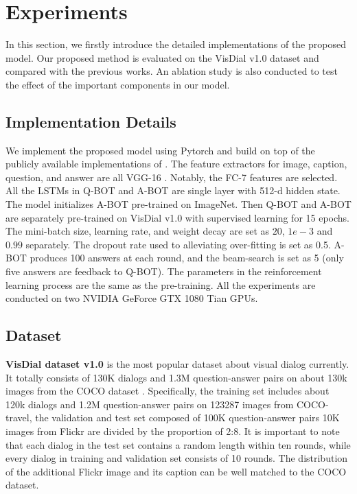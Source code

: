 \documentclass[review]{elsarticle}
\begin{document}
	\section{Experiments}
	In this section, we firstly introduce the detailed implementations of the proposed model. Our proposed method is evaluated on the VisDial v1.0 dataset and compared with the previous works. An ablation study is also conducted to test the effect of the important components in our model. 
	\subsection{Implementation Details} 
	We implement the proposed model using Pytorch and build on top of the publicly available implementations of \cite{DBLP:conf/iccv/DasKMLB17}. 
	The feature extractors for image, caption, question, and answer are all VGG-16 \cite{DBLP:journals/corr/SimonyanZ14a}. Notably, the FC-7 features are selected. 
	All the LSTMs in Q-BOT and A-BOT are single layer with 512-d hidden state. The model initializes A-BOT pre-trained on ImageNet. 
	Then Q-BOT and A-BOT are separately pre-trained on VisDial v1.0 with supervised learning for 15 epochs. The mini-batch size, learning rate, and weight decay are set as $20$, $1e-3$ and $0.99$ separately. The dropout rate used to alleviating over-fitting is set as 0.5. 
	A-BOT produces 100 answers at each round, and the beam-search is set as 5 (only five answers are feedback to Q-BOT). The parameters in the reinforcement learning process are the same as the pre-training. All the experiments are conducted on two NVIDIA GeForce GTX 1080 Tian GPUs. 
	
	\subsection{Dataset}
	\textbf{VisDial dataset v1.0} is the most popular dataset about visual dialog currently. It totally consists of 130K dialogs and 1.3M question-answer pairs on about 130k images from the COCO dataset \cite{DBLP:conf/eccv/LinMBHPRDZ14}. 
	Specifically, the training set includes about 120k dialogs and 1.2M question-answer pairs on 123287 images from COCO-travel, the validation and test set composed of 100K question-answer pairs 10K images from Flickr are divided by the proportion of 2:8. 
	It is important to note that each dialog in the test set contains a random length within ten rounds, while every dialog in training and validation set consists of 10 rounds. The distribution of the additional Flickr image and its caption can be well matched to the COCO dataset. 
	
\end{document}
